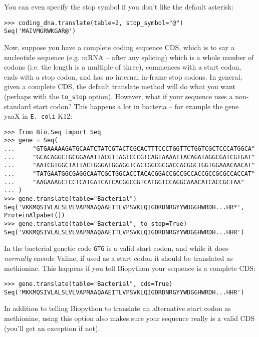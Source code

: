 You can even specify the stop symbol if you don't like the default asterisk:

\begin{verbatim}
>>> coding_dna.translate(table=2, stop_symbol="@")
Seq('MAIVMGRWKGAR@')
\end{verbatim}

Now, suppose you have a complete coding sequence CDS, which is to say a
nucleotide sequence (e.g. mRNA -- after any splicing) which is a whole number
of codons (i.e. the length is a multiple of three), commences with a start
codon, ends with a stop codon, and has no internal in-frame stop codons.
In general, given a complete CDS, the default translate method will do what
you want (perhaps with the \verb|to_stop| option). However, what if your
sequence uses a non-standard start codon? This happens a lot in bacteria --
for example the gene yaaX in \texttt{E. coli} K12:

\begin{verbatim}
>>> from Bio.Seq import Seq
>>> gene = Seq(
...     "GTGAAAAAGATGCAATCTATCGTACTCGCACTTTCCCTGGTTCTGGTCGCTCCCATGGCA"
...     "GCACAGGCTGCGGAAATTACGTTAGTCCCGTCAGTAAAATTACAGATAGGCGATCGTGAT"
...     "AATCGTGGCTATTACTGGGATGGAGGTCACTGGCGCGACCACGGCTGGTGGAAACAACAT"
...     "TATGAATGGCGAGGCAATCGCTGGCACCTACACGGACCGCCGCCACCGCCGCGCCACCAT"
...     "AAGAAAGCTCCTCATGATCATCACGGCGGTCATGGTCCAGGCAAACATCACCGCTAA"
... )
>>> gene.translate(table="Bacterial")
Seq('VKKMQSIVLALSLVLVAPMAAQAAEITLVPSVKLQIGDRDNRGYYWDGGHWRDH...HR*',
ProteinAlpabet())
>>> gene.translate(table="Bacterial", to_stop=True)
Seq('VKKMQSIVLALSLVLVAPMAAQAAEITLVPSVKLQIGDRDNRGYYWDGGHWRDH...HHR')
\end{verbatim}

\noindent In the bacterial genetic code \texttt{GTG} is a valid start codon,
and while it does \emph{normally} encode Valine, if used as a start codon it
should be translated as methionine. This happens if you tell Biopython your
sequence is a complete CDS:

\begin{verbatim}
>>> gene.translate(table="Bacterial", cds=True)
Seq('MKKMQSIVLALSLVLVAPMAAQAAEITLVPSVKLQIGDRDNRGYYWDGGHWRDH...HHR')
\end{verbatim}

In addition to telling Biopython to translate an alternative start codon as
methionine, using this option also makes sure your sequence really is a valid
CDS (you'll get an exception if not).

